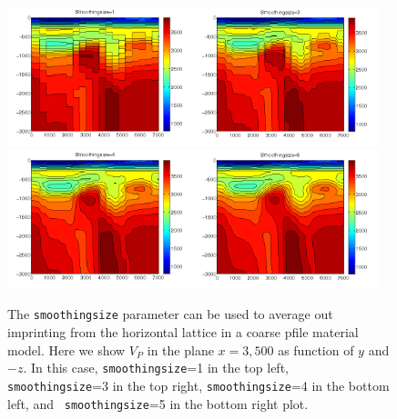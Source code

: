 \documentclass[11pt]{report}
\begin{document}
\begin{figure}
\begin{centering}
  \includegraphics[width=0.48\textwidth]{ps1.png}\hfill \includegraphics[width=0.48\textwidth]{ps3.png}\\
  \includegraphics[width=0.48\textwidth]{ps4.png}\hfill \includegraphics[width=0.48\textwidth]{ps5.png} 
  \caption{The {\tt smoothingsize} parameter can be used to average out imprinting from the
    horizontal lattice in a coarse pfile material model. Here we show $V_P$ in the plane $x=3,500$
    as function of $y$ and $-z$. In this case, {\tt smoothingsize}=1 in the top left, {\tt
    smoothingsize}=3 in the top right, {\tt smoothingsize}=4 in the bottom left, and  {\tt
      smoothingsize}=5 in the bottom right plot.}
  \label{fig:pfile-smoothing}
\end{centering}
\end{figure}
\end{document}
